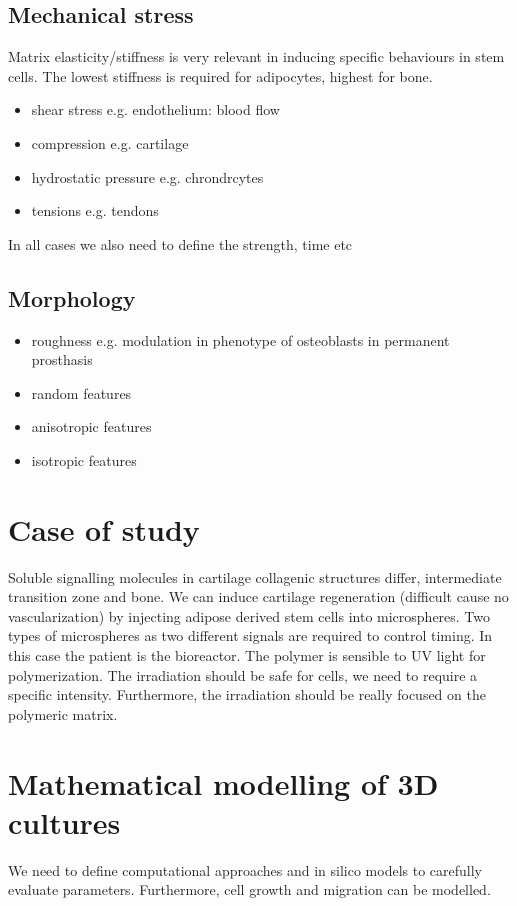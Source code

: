 \subsection{Mechanical stress}
Matrix elasticity/stiffness is very relevant in inducing specific behaviours in stem cells. 
The lowest stiffness is required for adipocytes, highest for bone. 
\begin{itemize}
\item shear stress e.g. endothelium: blood flow
\item compression e.g. cartilage
\item hydrostatic pressure e.g. chrondrcytes
\item tensions e.g. tendons
\end{itemize}
In all cases we also need to define the strength, time etc

\subsection{Morphology}
\begin{itemize}
\item roughness e.g. modulation in phenotype of osteoblasts in permanent prosthasis
\item random features
\item anisotropic features
\item isotropic features
\end{itemize}

\section{Case of study}
Soluble signalling molecules in cartilage collagenic structures differ, intermediate transition zone and bone. We can induce cartilage regeneration (difficult cause no vascularization) by injecting adipose derived stem cells into microspheres. Two types of microspheres as two different signals are required to control timing. 
In this case the patient is the bioreactor.
The polymer is sensible to UV light for polymerization. The irradiation should be safe for cells, we need to require a specific intensity. Furthermore, the irradiation should be really focused on the polymeric matrix. 

\section{Mathematical modelling of 3D cultures}
We need to define computational approaches and in silico models to carefully evaluate parameters. Furthermore, cell growth and migration can be modelled.

